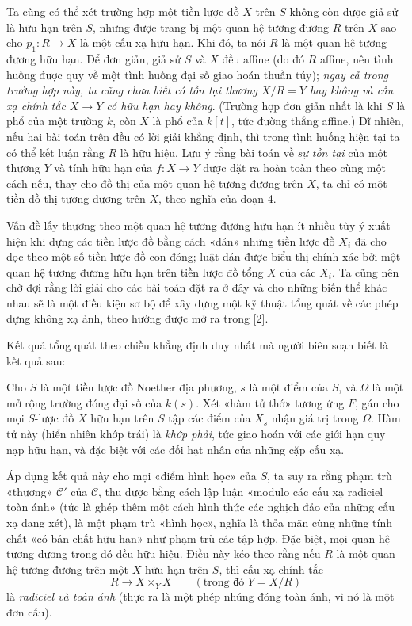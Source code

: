 Ta cũng có thể xét trường hợp một tiền lược đồ $X$ trên $S$ không còn được
giả sử là hữu hạn trên $S$, nhưng được trang bị một quan hệ tương đương $R$
trên $X$ sao cho $p_1:R\longrightarrow X$ là một cấu xạ hữu hạn. Khi đó, ta
nói $R$ là một quan hệ tương đương hữu hạn. Để đơn giản, giả sử $S$ và $X$
đều affine (do đó $R$ affine, nên tình huống được quy về một tình huống đại số
giao hoán thuần túy); \emph{ngay cả trong trường hợp này, ta cũng chưa biết có
tồn tại thương $X/R=Y$ hay không và cấu xạ chính tắc
$X\longrightarrow Y$ có hữu hạn hay không}. (Trường hợp đơn giản nhất là khi
$S$ là phổ của một trường $k$, còn $X$ là phổ của $k[t]$, tức đường thẳng
affine.) Dĩ nhiên, nếu hai bài toán trên đều có lời giải khẳng định, thì trong
tình huống hiện tại ta có thể kết luận rằng $R$ là hữu hiệu. Lưu ý rằng bài
toán về \emph{sự tồn tại} của một thương $Y$ và tính hữu hạn của
$f:X\longrightarrow Y$ được đặt ra hoàn toàn theo cùng một cách nếu, thay cho
đồ thị của một quan hệ tương đương trên $X$, ta chỉ có một tiền đồ thị tương
đương trên $X$, theo nghĩa của đoạn 4.

Vấn đề lấy thương theo một quan hệ tương đương hữu hạn ít nhiều tùy ý xuất
hiện khi dựng các tiền lược đồ bằng cách «dán» những tiền lược đồ $X_i$ đã cho
dọc theo một số tiền lược đồ con đóng; luật dán được biểu thị chính xác bởi
một quan hệ tương đương hữu hạn trên tiền lược đồ tổng $X$ của các $X_i$. Ta
cũng nên chờ đợi rằng lời giải cho các bài toán đặt ra ở đây và cho những biến
thể khác nhau sẽ là một điều kiện sơ bộ để xây dựng một kỹ thuật tổng quát về
các phép dựng không xạ ảnh, theo hướng được mở ra trong [2].

Kết quả tổng quát theo chiều khẳng định duy nhất mà người biên soạn biết là
kết quả sau:

 Cho $S$ là một tiền lược đồ Noether địa phương, $s$ là
một điểm của $S$, và $\Omega$ là một mở rộng trường đóng đại số của $k(s)$.
Xét
«hàm tử thớ» tương ứng $F$, gán cho mọi $S$-lược đồ $X$ hữu hạn
trên $S$ tập các điểm của $X_s$ nhận giá trị trong $\Omega$. Hàm tử này (hiển
nhiên khớp trái) là \emph{khớp phải}, tức giao hoán với các giới hạn quy nạp
hữu hạn, và đặc biệt với các đối hạt nhân của những cặp cấu xạ.

Áp dụng kết quả này cho mọi «điểm hình học» của $S$, ta suy ra rằng phạm trù
«thương» $\mathcal C'$ của $\mathcal C$, thu được bằng cách lập luận «modulo
các cấu xạ radiciel toàn ánh» (tức là ghép thêm một cách hình thức các nghịch
đảo của những cấu xạ đang xét), là một phạm trù «hình học», nghĩa là thỏa mãn
cùng những tính chất «có bản chất hữu hạn» như phạm trù các tập hợp. Đặc biệt,
mọi quan hệ tương đương trong đó đều hữu hiệu. Điều này kéo theo rằng nếu $R$
là một quan hệ tương đương trên một $X$ hữu hạn trên $S$, thì cấu xạ chính tắc
\[
  R\longrightarrow X\times_Y X\qquad (\text{trong đó }Y=X/R)
\]
là \emph{radiciel và toàn ánh} (thực ra là một phép nhúng đóng toàn ánh, vì nó
là một đơn cấu).

